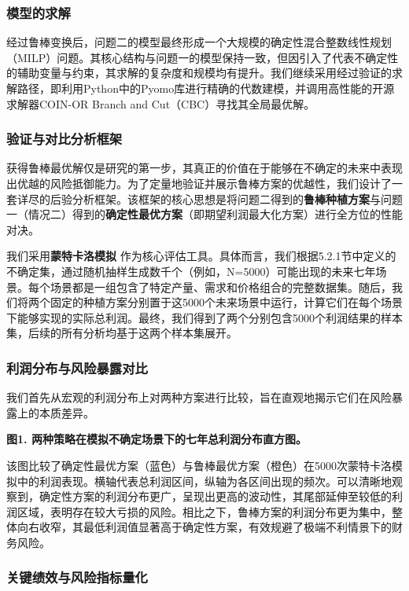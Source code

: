 \documentclass[withoutpreface,bwprint]{cumcmthesis} %
\begin{document}
\subsubsection{模型的求解}

经过鲁棒变换后，问题二的模型最终形成一个大规模的确定性混合整数线性规划（MILP）问题。其核心结构与问题一的模型保持一致，但因引入了代表不确定性的辅助变量与约束，其求解的复杂度和规模均有提升。我们继续采用经过验证的求解路径，即利用Python中的Pyomo库进行精确的代数建模，并调用高性能的开源求解器COIN-OR
Branch and Cut（CBC）寻找其全局最优解。

\subsubsection{验证与对比分析框架}

获得鲁棒最优解仅是研究的第一步，其真正的价值在于能够在不确定的未来中表现出优越的风险抵御能力。为了定量地验证并展示鲁棒方案的优越性，我们设计了一套详尽的后验分析框架。该框架的核心思想是将问题二得到的\textbf{鲁棒种植方案}与问题一（情况二）得到的\textbf{确定性最优方案}（即期望利润最大化方案）进行全方位的性能对决。

我们采用\textbf{蒙特卡洛模拟}
作为核心评估工具。具体而言，我们根据5.2.1节中定义的不确定集，通过随机抽样生成数千个（例如，N=5000）可能出现的未来七年场景。每个场景都是一组包含了特定产量、需求和价格组合的完整数据集。随后，我们将两个固定的种植方案分别置于这5000个未来场景中运行，计算它们在每个场景下能够实现的实际总利润。最终，我们得到了两个分别包含5000个利润结果的样本集，后续的所有分析均基于这两个样本集展开。

\subsubsection{利润分布与风险暴露对比}

我们首先从宏观的利润分布上对两种方案进行比较，旨在直观地揭示它们在风险暴露上的本质差异。

\textbf{图1. 两种策略在模拟不确定场景下的七年总利润分布直方图。}

该图比较了确定性最优方案（蓝色）与鲁棒最优方案（橙色）在5000次蒙特卡洛模拟中的利润表现。横轴代表总利润区间，纵轴为各区间出现的频次。可以清晰地观察到，确定性方案的利润分布更广，呈现出更高的波动性，其尾部延伸至较低的利润区域，表明存在较大亏损的风险。相比之下，鲁棒方案的利润分布更为集中，整体向右收窄，其最低利润值显著高于确定性方案，有效规避了极端不利情景下的财务风险。

\subsubsection{关键绩效与风险指标量化}
\end{document}
